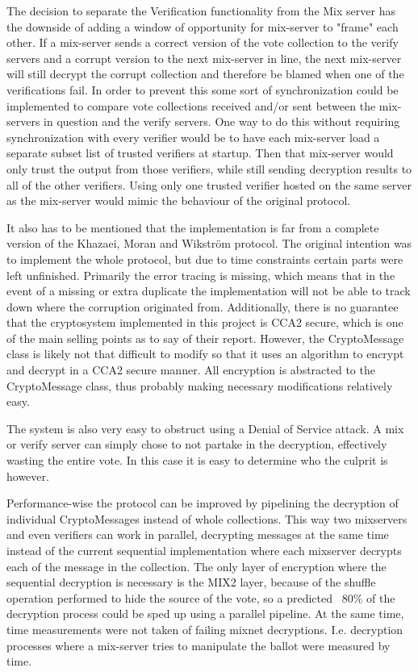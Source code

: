 \documentclass[a4paper,11pt]{kth-mag}
\begin{document}
The decision to separate the Verification functionality from the Mix server has the downside of adding a window of opportunity for mix-server to "frame" each other. If a mix-server sends a correct version of the vote collection to the verify servers and a corrupt version to the next mix-server in line, the next mix-server will still decrypt the corrupt collection and therefore be blamed when one of the verifications fail. In order to prevent this some sort of synchronization could be implemented to compare vote collections received and/or sent between the mix-servers in question and the verify servers. One way to do this without requiring synchronization with every verifier would be to have each mix-server load a separate subset list of trusted verifiers at startup. Then that mix-server would only trust the output from those verifiers, while still sending decryption results to all of the other verifiers. Using only one trusted verifier hosted on the same server as the mix-server would mimic the behaviour of the original protocol.

It also has to be mentioned that the implementation is far from a complete version of the Khazaei, Moran and Wikström protocol. The original intention was to implement the whole protocol, but due to time constraints certain parts were left unfinished. Primarily the error tracing is missing, which means that in the event of a missing or extra duplicate the implementation will not be able to track down where the corruption originated from. Additionally, there is no guarantee that the cryptosystem implemented in this project is CCA2 secure, which is one of the main selling points as to say of their report. However, the CryptoMessage class is likely not that difficult to modify so that it uses an algorithm to encrypt and decrypt in a CCA2 secure manner. All encryption is abstracted to the CryptoMessage class, thus probably making necessary modifications relatively easy.

The system is also very easy to obstruct using a Denial of Service attack. A mix or verify server can simply chose to not partake in the decryption, effectively wasting the entire vote. In this case it is easy to determine who the culprit is however.

Performance-wise the protocol can be improved by pipelining the decryption of individual CryptoMessages instead of whole collections. This way two mixservers and even verifiers can work in parallel, decrypting messages at the same time instead of the current sequential implementation where each mixserver decrypts each of the message in the collection. The only layer of encryption where the sequential decryption is necessary is the MIX2 layer, because of the shuffle operation performed to hide the source of the vote, so a predicted ~80\% of the decryption process could be sped up using a parallel pipeline. At the same time, time measurements were not taken of failing mixnet decryptions. I.e. decryption processes where a mix-server tries to manipulate the ballot were measured by time. 
\end{document}
